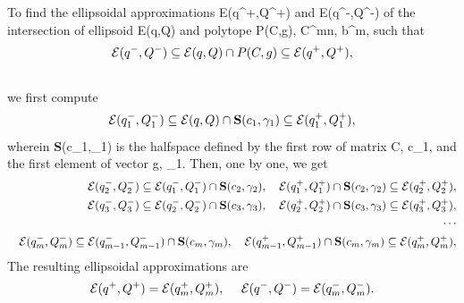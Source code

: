 \documentclass[letterpaper,10pt,english]{sphinxmanual}
\begin{document}
To find the ellipsoidal approximations {\mathcal E}(q^+,Q^+) and
{\mathcal E}(q^-,Q^-) of the intersection of ellipsoid
{\mathcal E}(q,Q) and polytope P(C,g),
C^{m\times n}, b^m, such that
\begin{gather}
\begin{split}{\mathcal E}(q^-,Q^-)\subseteq{\mathcal E}(q,Q)\cap P(C,g)\subseteq{\mathcal E}(q^+,Q^+),\end{split}\notag\\\begin{split}\end{split}\notag
\end{gather}
we first compute
\begin{gather}
\begin{split}{\mathcal E}(q^-_1,Q^-_1)\subseteq{\mathcal E}(q,Q)\cap{\bf S}(c_1,\gamma_1)\subseteq
{\mathcal E}(q^+_1,Q^+_1),\end{split}\notag
\end{gather}
wherein {\bf S}(c_1,\gamma_1) is the halfspace defined by the
first row of matrix C, c_1, and the first element of
vector g, \gamma_1. Then, one by one, we get
\begin{gather}
\begin{split}\begin{aligned}
& & {\mathcal E}(q^-_2,Q^-_2)\subseteq{\mathcal E}(q^-_1,Q^-_1)\cap{\bf S}(c_2,\gamma_2), ~~~
{\mathcal E}(q^+_1,Q^+_1)\cap{\bf S}(c_2,\gamma_2)\subseteq{\mathcal E}(q^+_2,Q^+_2), \\
& & {\mathcal E}(q^-_3,Q^-_3)\subseteq{\mathcal E}(q^-_2,Q^-_2)\cap{\bf S}(c_3,\gamma_3), ~~~
{\mathcal E}(q^+_2,Q^+_2)\cap{\bf S}(c_3,\gamma_3)\subseteq{\mathcal E}(q^+_3,Q^+_3), \\
& & \cdots \\
& & {\mathcal E}(q^-_m,Q^-_m)\subseteq{\mathcal E}(q^-_{m-1},Q^-_{m-1})\cap{\bf S}(c_m,\gamma_m), ~~~
{\mathcal E}(q^+_{m-1},Q^+_{m-1})\cap{\bf S}(c_m,\gamma_m)\subseteq{\mathcal E}(q^+_m,Q^+_m), \\\end{aligned}\end{split}\notag
\end{gather}
The resulting ellipsoidal approximations are
\begin{gather}
\begin{split}{\mathcal E}(q^+,Q^+)={\mathcal E}(q^+_m,Q^+_m), ~~~~ {\mathcal E}(q^-,Q^-)={\mathcal E}(q^-_m,Q^-_m) .\end{split}\notag\\\begin{split}\end{split}\notag
\end{gather}
\end{document}
